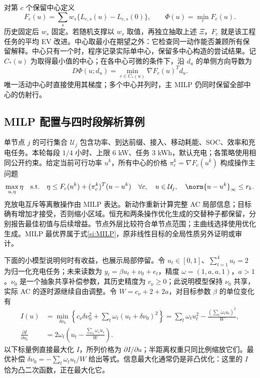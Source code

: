 对第 $c$ 个保留中心定义
\begin{equation}
 F_c(u)=\sum_sw_s\{L_{c,s}(u)-L_{c,s}(0)\},\qquad
 \boxed{\Phi(u)=\min_c F_c(u).}
 \label{si:robust-task}
\end{equation}
历史固定后 $w_s$ 固定。若随机支撑以 $w_s$ 取值，再独立抽取上述 $\Xi$，$F_c$ 就是该工程任务的平均 EV 改进。中心取最小在期望之外：它检查同一动作能否兼顾所有保留解释。中心只有一个时，程序记录实际单中心，保留多中心构造的尝试结果。记 $C_*(u)$ 为取得最小值的中心；在各中心可微的条件下，沿 $d_u$ 的单侧方向导数为
\begin{equation}
 D\Phi(u;d_u)=\min_{c\in C_*(u)}\nabla F_c(u)^Td_u.
 \label{si:active-centers}
\end{equation}
唯一活动中心时直接使用其梯度；多个中心并列时，主 MILP 仍同时保留全部中心的仿射行。

\subsection{MILP 配置与四时段解析算例}

单节点 $j$ 的可行集合 $\mathcal U_j$ 包含功率、到达前缀、接入、移动耗能、SOC、效率和充电任务。本轮每段 $1/4$ 小时、上限 6 kW、任务 3 kWh，默认充电；各策略使用相同公开约束。给定当前可行功率 $u^k$，所有中心的价格 $\pi_c^k=\nabla F_c(u^k)$ 构成操作主问题
\begin{equation}
 \max_{u,\eta}\eta\quad\text{s.t.}\quad
 \eta\le F_c(u^k)+(\pi_c^k)^T(u-u^k)\quad\forall c,
 \quad u\in\mathcal U_j,\quad\norm{u-u^k}_\infty\le r_k.
 \label{si:MILP}
\end{equation}
充放电互斥等离散操作由 MILP 表达。新动作重新计算完整 AC 局部信息；目标确有增加才接受，否则缩小区域。恒充和两条操作优化生成的交替种子都保留，分别报告最佳初值与后续增益。节点外层比较符合单节点范围；主曲线选择使用优化生成。MILP 最优界属于式\eqref{si:MILP}，原非线性目标的全局性质另外证明或审计。

下面的小模型说明何时有收益，也展示局部停留。令 $u_t\in[0,1]$、$\sum_{t=1}^4u_t=2$ 为归一化充电任务；未来读数为 $y_t=\beta u_t+\nu_0+e_t$，精度 $\omega=(1,a,a,1)$，$a>1$。$\nu_0$ 是一个抽象共享补偿参数，其历史精度为 $c_\nu\ge0$；此说明模型保持 $\nu_0$ 共享，实际 AC 的逐时源继续自由调整。令 $W=c_\nu+2+2a$，对目标参数 $\beta$ 的单位变化有
\begin{align}
 I(u)&=\min_{\delta\nu_0}\left\{c_\nu\delta\nu_0^2+\sum_t\omega_t(u_t+\delta\nu_0)^2\right\}
 =\sum_t\omega_tu_t^2-\frac{(\sum_t\omega_tu_t)^2}{W},\nonumber\\
 \frac{\partial I}{\partial u_t}&=2\omega_t\left(u_t-\frac{\sum_s\omega_su_s}{W}\right).
 \label{si:scalar}
\end{align}
以下标量例直接最大化 $I$，所列价格为 $\partial I/\partial u$；半距离权重只同比例缩放它们。最优补偿 $\delta\nu_0=-\sum_t\omega_tu_t/W$ 给出等式。信息最大化通常仍是非凸优化：这里的 $I$ 恰为凸二次函数，正在最大化它。

